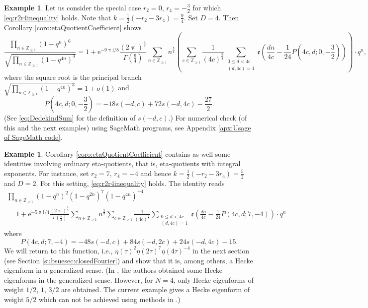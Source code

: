 \documentclass[12pt]{amsart}
\numberwithin{equation}{section}
\theoremstyle{plain}
\theoremstyle{definition}
\newtheorem{examp}[thm]{Example}
\theoremstyle{remark}
\newcommand\twoscript[2]{\substack{{#1} \\ {#2}}}
\newcommand\rmi{\mathrm{i}}
\newcommand\rme{\mathrm{e}}
\newcommand\etp[1]{\mathfrak{e}\left(#1\right)}
\newcommand\numgeq[2]{\mathbb{#1}_{\geq #2}}
\begin{document}
\begin{examp}
\label{examp:App1Examp1}
Let us consider the special case $r_2=0$, $r_4=-\frac{3}{2}$ for which \eqref{eq:r2r4inequality} holds. Note that $k=\frac{1}{2}(-r_2-3r_4)=\frac{9}{4}$. Set $D=4$. Then Corollary \ref{coro:etaQuotientCoefficient} shows
\begin{equation*}
\frac{\prod_{n\in\numgeq{Z}{1}}(1-q^n)^6}{\sqrt{\prod_{n\in\numgeq{Z}{1}}(1-q^{4n})^3}}=1+\rme^{-9\uppi\rmi /8}\frac{(2\uppi)^{\frac{9}{4}}}{\Gamma(\frac{9}{4})}\sum_{n\in\numgeq{Z}{1}}n^{\frac{5}{4}}\left(\sum_{c\in\numgeq{Z}{1}}\frac{1}{(4c)^{\frac{9}{4}}}\sum_{\twoscript{0\leq d<4c}{(d,4c)=1}}\etp{\frac{dn}{4c}-\frac{1}{24}P(4c,d;0,-\frac{3}{2})}\right)\cdot q^n,
\end{equation*}
where the square root is the principal branch $\sqrt{\prod_{n\in\numgeq{Z}{1}}(1-q^{4n})^3}=1+o(1)$ and
\begin{equation*}
P(4c,d;0,-\frac{3}{2})=-18s(-d,c)+72s(-d,4c)-\frac{27}{2}.
\end{equation*}
(See \eqref{eq:DedekindSum} for the definition of $s(-d,c)$.) For numerical check (of this and the next examples) using SageMath programs, see Appendix \ref{apx:Usage of SageMath code}.
\end{examp}
\begin{examp}
\label{examp:N4rn274}
Corollary \ref{coro:etaQuotientCoefficient} contains as well some identities involving ordinary eta-quotients, that is, eta-quotients with integral exponents. For instance, set $r_2=7$, $r_4=-4$ and hence $k=\frac{1}{2}(-r_2-3r_4)=\frac{5}{2}$ and $D=2$. For this setting, \eqref{eq:r2r4inequality} holds. The identity reads
\begin{multline*}
\prod_{n\in\numgeq{Z}{1}}(1-q^n)^2(1-q^{2n})^7(1-q^{4n})^{-4}\\
=1+\rme^{-5\uppi\rmi/4}\frac{(2\uppi)^{\frac{5}{2}}}{\Gamma(\frac{5}{2})}\sum_{n\in\numgeq{Z}{1}}n^{\frac{3}{2}}\sum_{c\in\numgeq{Z}{1}}\frac{1}{(4c)^{\frac{5}{2}}}\sum_{\twoscript{0\leq d<4c}{(d,4c)=1}}\etp{\frac{dn}{4c}-\frac{1}{24}P(4c,d;7,-4)}\cdot q^n
\end{multline*}
where
\begin{equation*}
P(4c,d;7,-4)=-48s(-d,c)+84s(-d,2c)+24s(-d,4c)-15.
\end{equation*}
We will return to this function, i.e., $\eta(\tau)^2\eta(2\tau)^7\eta(4\tau)^{-4}$ in the next section (see Section \ref{subsuesec:closedFourier}) and show that it is, among others, a Hecke eigenform in a generalized sense. (In \cite[Section 4]{ZZ23}, the authors obtained some Hecke eigenforms in the generalized sense. However, for $N=4$, only Hecke eigenforms of weight $1/2$, $1$, $3/2$ are obtained. The current example gives a Hecke eigenform of weight $5/2$ which can not be achieved using methods in \cite{ZZ23}.)
\end{examp}
\end{document}

